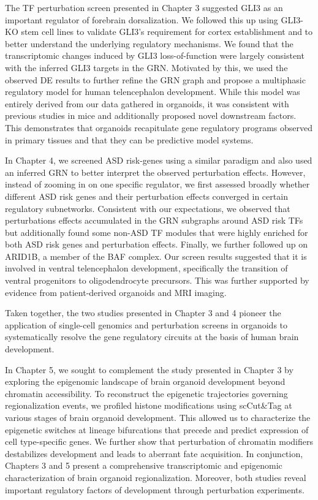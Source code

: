 The TF perturbation screen presented in Chapter 3 suggested GLI3 as an important regulator of forebrain dorsalization. We followed this up using GLI3-KO stem cell lines to validate GLI3's requirement for cortex establishment and to better understand the underlying regulatory mechanisms. We found that the transcriptomic changes induced by GLI3 loss-of-function were largely consistent with the inferred GLI3 targets in the GRN. Motivated by this, we used the observed DE results to further refine the GRN graph and propose a multiphasic regulatory model for human telencephalon development. While this model was entirely derived from our data gathered in organoids, it was consistent with previous studies in mice and additionally proposed novel downstream factors. This demonstrates that organoids recapitulate gene regulatory programs observed in primary tissues and that they can be predictive model systems.

In Chapter 4, we screened ASD risk-genes using a similar paradigm and also used an inferred GRN to better interpret the observed perturbation effects. However, instead of zooming in on one specific regulator, we first assessed broadly whether different ASD risk genes and their perturbation effects converged in certain regulatory subnetworks. Consistent with our expectations, we observed that perturbations effects accumulated in the GRN subgraphs around ASD risk TFs but additionally found some non-ASD TF modules that were highly enriched for both ASD risk genes and perturbation effects. Finally, we further followed up on ARID1B, a member of the BAF complex. Our screen results suggested that it is involved in ventral telencephalon development, specifically the transition of ventral progenitors to oligodendrocyte precursors. This was further supported by evidence from patient-derived organoids and MRI imaging. 

Taken together, the two studies presented in Chapter 3 and 4 pioneer the application of single-cell genomics and perturbation screens in organoids to systematically resolve the gene regulatory circuits at the basis of human brain development. 

In Chapter 5, we sought to complement the study presented in Chapter 3 by exploring the epigenomic landscape of brain organoid development beyond chromatin accessibility. To reconstruct the epigenetic trajectories governing regionalization events, we profiled histone modifications using scCut\&Tag at various stages of brain organoid development. This allowed us to characterize the epigenetic switches at lineage bifurcations that precede and predict expression of cell type-specific genes. We further show that  perturbation of chromatin modifiers destabilizes development and leads to aberrant fate acquisition. In conjunction, Chapters 3 and 5 present a comprehensive transcriptomic and epigenomic characterization of brain organoid regionalization. Moreover, both studies reveal important regulatory factors of development through perturbation experiments.



